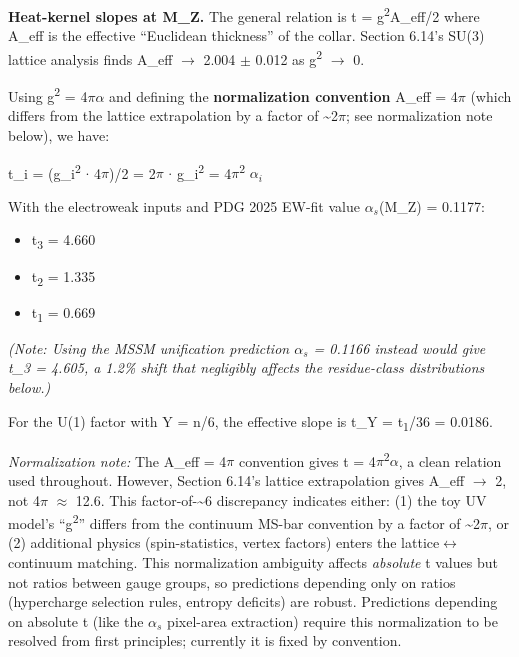 \documentclass[11pt,a4paper]{article}
\theoremstyle{remark}
\providecommand{\tightlist}{%
  \setlength{\itemsep}{0pt}\setlength{\parskip}{0pt}}
\begin{document}
\textbf{Heat-kernel slopes at M\_Z.} The general relation is t = g\textsuperscript{2}A\_eff/2 where
A\_eff is the effective ``Euclidean thickness'' of the collar. Section 6.14's
SU(3) lattice analysis finds A\_eff \ensuremath{\to} 2.004 \ensuremath{\pm} 0.012 as g\textsuperscript{2} \ensuremath{\to} 0.

Using g\textsuperscript{2} = 4\ensuremath{\pi}\ensuremath{\alpha} and defining the \textbf{normalization convention} A\_eff = 4\ensuremath{\pi}
(which differs from the lattice extrapolation by a factor of \textasciitilde2\ensuremath{\pi}; see
normalization note below), we have:

t\_i = (g\_i\textsuperscript{2} \ensuremath{\cdot} 4\ensuremath{\pi})/2 = 2\ensuremath{\pi} \ensuremath{\cdot} g\_i\textsuperscript{2} = 4\ensuremath{\pi}\textsuperscript{2} $\alpha_i$

With the electroweak inputs and PDG 2025 EW-fit value $\alpha_s$(M\_Z) = 0.1177:

\begin{itemize}
\tightlist
\item
  t\textsubscript{3} = 4.660
\item
  t\textsubscript{2} = 1.335
\item
  t\textsubscript{1} = 0.669
\end{itemize}

\emph{(Note: Using the MSSM unification prediction $\alpha_s$ = 0.1166 instead would give
t\_3 = 4.605, a 1.2\% shift that negligibly affects the residue-class distributions
below.)}

For the U(1) factor with Y = n/6, the effective slope is t\_Y = t\textsubscript{1}/36 = 0.0186.

\emph{Normalization note:} The A\_eff = 4\ensuremath{\pi} convention gives t = 4\ensuremath{\pi}\textsuperscript{2}\ensuremath{\alpha}, a clean
relation used throughout. However, Section 6.14's lattice extrapolation
gives A\_eff \ensuremath{\to} 2, not 4\ensuremath{\pi} \ensuremath{\approx} 12.6. This factor-of-\textasciitilde6 discrepancy indicates
either: (1) the toy UV model's ``g\textsuperscript{2}'' differs from the continuum MS-bar
convention by a factor of \textasciitilde2\ensuremath{\pi}, or (2) additional physics (spin-statistics,
vertex factors) enters the lattice\ensuremath{\leftrightarrow}continuum matching. This normalization
ambiguity affects \emph{absolute} t values but not ratios between gauge groups,
so predictions depending only on ratios (hypercharge selection rules,
entropy deficits) are robust. Predictions depending on absolute t (like
the $\alpha_s$ pixel-area extraction) require this normalization to be resolved
from first principles; currently it is fixed by convention.
\end{document}
